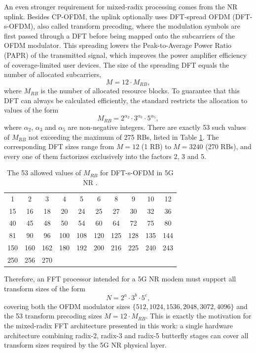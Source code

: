 \documentclass[a4paper,12pt, master]{etf}
\begin{document}
An even stronger requirement for mixed-radix processing comes from the NR uplink. Besides CP-OFDM, the uplink optionally uses DFT-spread OFDM (DFT-s-OFDM), also called transform precoding, where the modulation symbols are first passed through a DFT before being mapped onto the subcarriers of the OFDM modulator. This spreading lowers the Peak-to-Average Power Ratio (PAPR) of the transmitted signal, which improves the power amplifier efficiency of coverage-limited user devices. The size of the spreading DFT equals the number of allocated subcarriers,
\begin{equation}
    M = 12 \cdot M_{RB},
\label{eq:nr_dft_size}
\end{equation}
where $M_{RB}$ is the number of allocated resource blocks. To guarantee that this DFT can always be calculated efficiently, the standard \cite{17} restricts the allocation to values of the form
\begin{equation}
    M_{RB} = 2^{\alpha_2} \cdot 3^{\alpha_3} \cdot 5^{\alpha_5},
\label{eq:nr_rb_constraint}
\end{equation}
where $\alpha_2$, $\alpha_3$ and $\alpha_5$ are non-negative integers. There are exactly 53 such values of $M_{RB}$ not exceeding the maximum of 275 RBs, listed in Table \ref{tab:nr_dft_sizes}. The corresponding DFT sizes range from $M = 12$ (1 RB) to $M = 3240$ (270 RBs), and every one of them factorizes exclusively into the factors 2, 3 and 5.

\begin{table}[htb]
\centering
\caption{The 53 allowed values of $M_{RB}$ for DFT-s-OFDM in 5G NR \cite{17}.}
\medskip
\label{tab:nr_dft_sizes}
\begin{tabular}{c c c c c c c c c c}
\hline
1 & 2 & 3 & 4 & 5 & 6 & 8 & 9 & 10 & 12\\
15 & 16 & 18 & 20 & 24 & 25 & 27 & 30 & 32 & 36\\
40 & 45 & 48 & 50 & 54 & 60 & 64 & 72 & 75 & 80\\
81 & 90 & 96 & 100 & 108 & 120 & 125 & 128 & 135 & 144\\
150 & 160 & 162 & 180 & 192 & 200 & 216 & 225 & 240 & 243\\
250 & 256 & 270 & & & & & & & \\
\hline
\end{tabular}
\end{table}

Therefore, an FFT processor intended for a 5G NR modem must support all transform sizes of the form
\begin{equation}
    N = 2^{a} \cdot 3^{b} \cdot 5^{c},
\label{eq:nr_fft_sizes_form}
\end{equation}
covering both the OFDM modulator sizes $\{512, 1024, 1536, 2048, 3072, 4096\}$ and the 53 transform precoding sizes $M = 12 \cdot M_{RB}$. This is exactly the motivation for the mixed-radix FFT architecture presented in this work: a single hardware architecture combining radix-2, radix-3 and radix-5 butterfly stages can cover all transform sizes required by the 5G NR physical layer.
\end{document}
